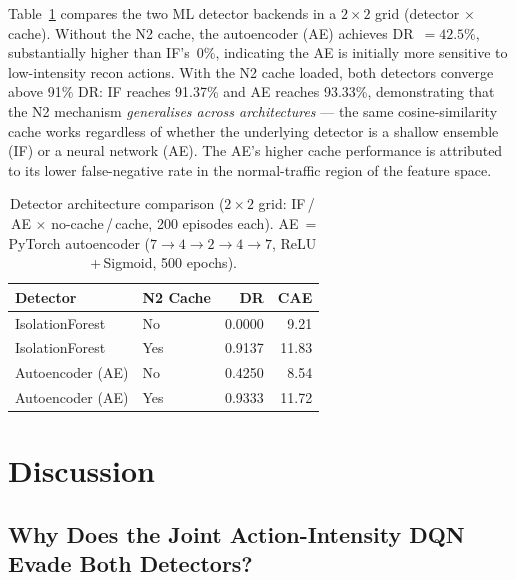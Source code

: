 \documentclass[sigconf]{acmart}
\begin{document}
Table~\ref{tab:detector} compares the two ML detector backends in a
$2\!\times\!2$ grid (detector $\times$ cache). Without the N2 cache, the
autoencoder (AE) achieves DR~$= 42.5\%$, substantially higher than
IF's~0\%, indicating the AE is initially more sensitive to low-intensity
recon actions. With the N2 cache loaded, both detectors converge above
91\% DR: IF reaches 91.37\% and AE reaches 93.33\%, demonstrating that
the N2 mechanism \emph{generalises across architectures} --- the same
cosine-similarity cache works regardless of whether the underlying
detector is a shallow ensemble (IF) or a neural network (AE). The AE's
higher cache performance is attributed to its lower false-negative rate
in the normal-traffic region of the feature space.

\begin{table}[t]
\caption{Detector architecture comparison ($2\!\times\!2$ grid: IF\,/\,AE $\times$
no-cache\,/\,cache, 200 episodes each). AE~= PyTorch autoencoder
($7{\to}4{\to}2{\to}4{\to}7$, ReLU\,+\,Sigmoid, 500 epochs).}
\label{tab:detector}
\centering
\begin{tabular}{l l r r}
\toprule
Detector & N2 Cache & DR & CAE \\
\midrule
IsolationForest  & No  & 0.0000 &  9.21 \\
IsolationForest  & Yes & 0.9137 & 11.83 \\
Autoencoder (AE) & No  & 0.4250 &  8.54 \\
Autoencoder (AE) & Yes & 0.9333 & 11.72 \\
\bottomrule
\end{tabular}
\end{table}

\section{Discussion}
\label{sec:discussion}

\subsection{Why Does the Joint Action-Intensity DQN Evade Both Detectors?}
\label{sec:disc:evasion}
\end{document}
